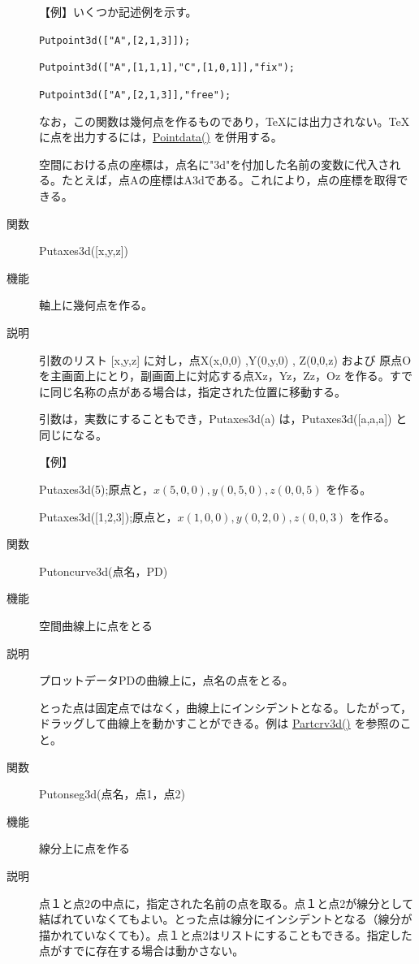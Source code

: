 \documentclass[papersize,a4paper,12pt,uplatex]{jsarticle}
\begin{document}
\begin{description}
\vspace{\baselineskip}
【例】いくつか記述例を示す。

\verb|Putpoint3d(["A",[2,1,3]]);|

\verb|Putpoint3d(["A",[1,1,1],"C",[1,0,1]],"fix");|

\verb|Putpoint3d(["A",[2,1,3]],"free");|

\vspace{\baselineskip}
なお，この関数は幾何点を作るものであり，TeXには出力されない。TeXに点を出力するには，\hyperlink{pointdata}{Pointdata()} を併用する。

空間における点の座標は，点名に"3d"を付加した名前の変数に代入される。たとえば，点Aの座標はA3dである。これにより，点の座標を取得できる。

\vspace{\baselineskip}
\hypertarget{putaxes3d}{}
\item[関数]Putaxes3d([x,y,z])
\item[機能]軸上に幾何点を作る。
\item[説明]引数のリスト [x,y,z] に対し，点X(x,0,0) ,Y(0,y,0) , Z(0,0,z) および 原点Oを主画面上にとり，副画面上に対応する点Xz，Yz，Zz，Oz を作る。すでに同じ名称の点がある場合は，指定された位置に移動する。

引数は，実数にすることもでき，Putaxes3d(a) は，Putaxes3d([a,a,a]) と同じになる。

\vspace{\baselineskip}
【例】

Putaxes3d(5);原点と，$x(5,0,0),y(0,5,0),z(0,0,5)$ を作る。

Putaxes3d([1,2,3]);原点と，$x(1,0,0),y(0,2,0),z(0,0,3)$ を作る。

\vspace{\baselineskip}
\hypertarget{putonCurve3d}{}
\item[関数]Putoncurve3d(点名，PD)
\item[機能]空間曲線上に点をとる
\item[説明]プロットデータPDの曲線上に，点名の点をとる。

とった点は固定点ではなく，曲線上にインシデントとなる。したがって，ドラッグして曲線上を動かすことができる。例は \hyperlink{partcrv3d}{Partcrv3d()} を参照のこと。
\vspace{\baselineskip}
\hypertarget{putonseg3d}{}
\item[関数]Putonseg3d(点名，点1，点2)
\item[機能]線分上に点を作る
\item[説明]点１と点2の中点に，指定された名前の点を取る。点１と点2が線分として結ばれていなくてもよい。とった点は線分にインシデントとなる（線分が描かれていなくても）。点１と点2はリストにすることもできる。指定した点がすでに存在する場合は動かさない。


\end{description}
\end{document}
